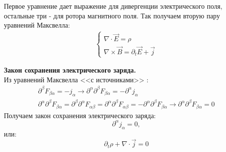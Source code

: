 Первое уравнение дает выражение для дивергенции электрического поля, остальные три - для ротора магнитного поля. Так получаем вторую пару уравнений Максвелла:
\begin{gather*}
\begin{cases}
\nabla \cdot \vec E = \rho\\
\nabla \times \vec B = \partial_t \vec E + \vec j
\end{cases}
\end{gather*}

\textbf{Закон сохранения электрического заряда.}\\
Из уравнений Максвелла <<с источниками>> :
\begin{gather*}
\partial^\beta F_{\beta\alpha} = -j_\alpha \longrightarrow \partial^\alpha\partial^\beta F_{\beta\alpha} = -\partial^\alpha j_\alpha\\
\partial^\alpha\partial^\beta F_{\beta\alpha} = \partial^\beta\partial^\alpha F_{\alpha\beta} = \partial^\alpha\partial^\beta F_{\alpha\beta} = - \partial^\alpha\partial^\beta F_{\beta\alpha} \longrightarrow \partial^\alpha\partial^\beta F_{\beta\alpha} = 0
\end{gather*}
Получаем закон сохранения электрического заряда:
$$\partial^\alpha j_\alpha = 0,$$
или:
$$\partial_t\rho + \nabla \cdot \vec j = 0$$
 

